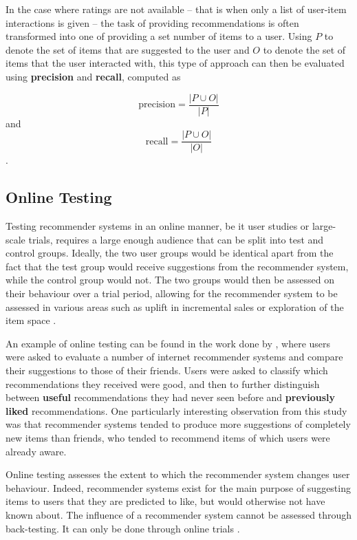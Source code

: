 In the case where ratings are not available -- that is when only a list of user-item interactions is given -- the task of providing recommendations is often transformed into one of providing a set number of items to a user. Using $P$ to denote the set of items that are suggested to the user and $O$ to denote the set of items that the user interacted with, this type of approach can then be evaluated using \textbf{precision} and \textbf{recall}, computed as

\begin{equation}
    \text{precision} = \dfrac{|P \cup O|}{|P|}
\end{equation}
and
\begin{equation}
    \text{recall} = \dfrac{|P \cup O|}{|O|}
\end{equation}
\parencite{handbook_1.4_neighbourhood}.

\subsection{Online Testing}
Testing recommender systems in an online manner, be it user studies or large-scale trials, requires a large enough audience that can be split into test and control groups. Ideally, the two user groups would be identical apart from the fact that the test group would receive suggestions from the recommender system, while the control group would not. The two groups would then be assessed on their behaviour over a trial period, allowing for the recommender system to be assessed in various areas such as uplift in incremental sales or exploration of the item space \parencite{online_predicting}.

An example of online testing can be found in the work done by \cite{swearingen2001beyondalgorithms}, where users were asked to evaluate a number of internet recommender systems and compare their suggestions to those of their friends. Users were asked to classify which recommendations they received were good, and then to further distinguish between \textbf{useful} recommendations they had never seen before and \textbf{previously liked} recommendations. One particularly interesting observation from this study was that recommender systems tended to produce more suggestions of completely new items than friends, who tended to recommend items of which users were already aware.

Online testing assesses the extent to which the recommender system changes user behaviour. Indeed, recommender systems exist for the main purpose of suggesting items to users that they are predicted to like, but would otherwise not have known about. The influence of a recommender system cannot be assessed through back-testing. It can only be done through online trials \parencite{handbook_1.4_neighbourhood}.

